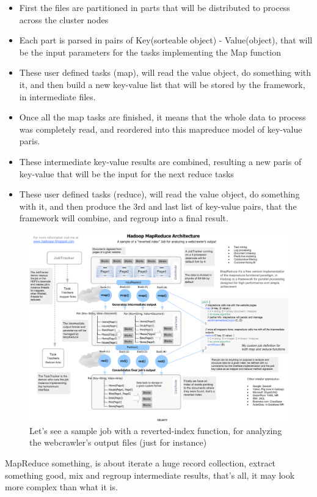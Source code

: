 \begin{itemize}
\item First the files are partitioned in parts that will be distributed to process across the cluster nodes
\item  Each part is parsed in pairs of Key(sorteable object) - Value(object), that will be the input parameters for the tasks implementing the Map function
\item  These user defined tasks (map), will read the value object, do something with it, and then build a new key-value list that will be stored by the framework, in intermediate files.
\item  Once all the map tasks are finished, it means that the whole data to process was completely read, and reordered into this mapreduce model of key-value paris.
\item  These intermediate key-value results are combined, resulting a new paris of key-value that will be the input for the next reduce tasks
\item  These user defined tasks (reduce), will read the value object, do something with it, and then produce the 3rd and last list of key-value pairs, that the framework will combine, and regroup into a final result.

\end{itemize}
\begin{figure}
\caption{Let's see a sample job with a reverted-index function, for analyzing the webcrawler's output files (just for instance)}
\label{tab:hadoop_map_reduce_architecture}
\centering
\includegraphics[scale=.33]{./img/HadoopMRProcessSample.png}
\end{figure}

MapReduce something, is about iterate a huge record collection, extract something good, mix and regroup intermediate results, that's all, it may look more complex than what it is.
